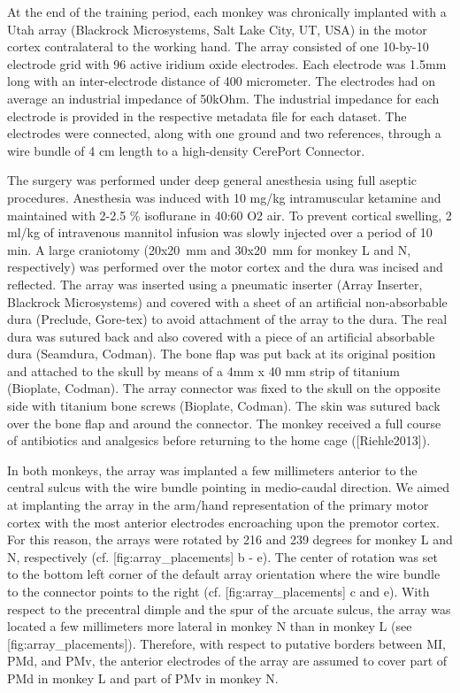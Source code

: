 {At the end of the training period, each monkey was chronically implanted with a Utah array (Blackrock Microsystems, Salt Lake City, UT, USA) in the motor cortex contralateral to the working hand. The array consisted of one 10-by-10 electrode grid with 96 active iridium oxide electrodes. Each electrode was 1.5mm long with an inter-electrode distance of 400 micrometer. The electrodes had on average an industrial impedance of 50kOhm. The industrial impedance for each electrode is provided in the respective metadata file for each dataset. The electrodes were connected, along with one ground and two references, through a wire bundle of 4 cm length to a high-density CerePort Connector. 

The surgery was performed under deep general anesthesia using full aseptic procedures. Anesthesia was induced with 10 mg/kg intramuscular ketamine and maintained with 2-2.5 \% isoflurane in 40:60 O2 air. To prevent cortical swelling, 2 ml/kg of intravenous mannitol infusion was slowly injected over a period of 10 min. A large craniotomy (20x20 mm and 30x20 mm for monkey L and N, respectively) was performed over the motor cortex and the dura was incised and reflected. The array was inserted using a pneumatic inserter (Array Inserter, Blackrock Microsystems) and covered with a sheet of an artificial non-absorbable dura (Preclude, Gore-tex) to avoid attachment of the array to the dura. The real dura was sutured back and also covered with a piece of an artificial absorbable dura (Seamdura, Codman). The bone flap was put back at its original position and attached to the skull by means of a 4mm x 40 mm strip of titanium (Bioplate, Codman). The array connector was fixed to the skull on the opposite side with titanium bone screws (Bioplate, Codman). The skin was sutured back over the bone flap and around the connector. The monkey received a full course of antibiotics and analgesics before returning to the home cage ([Riehle2013]).

In both monkeys, the array was implanted a few millimeters anterior to the central sulcus with the wire bundle pointing in medio-caudal direction. We aimed at implanting the array in the arm/hand representation of the primary motor cortex with the most anterior electrodes encroaching upon the premotor cortex. For this reason, the arrays were rotated by 216 and 239 degrees for monkey L and N, respectively (cf. [fig:array\_placements] b - e). The center of rotation was set to the bottom left corner of the default array orientation where the wire bundle to the connector points to the right (cf. [fig:array\_placements] c and e). With respect to the precentral dimple and the spur of the arcuate sulcus, the array was located a few millimeters more lateral in monkey N than in monkey L (see [fig:array\_placements]). Therefore, with respect to putative borders between MI, PMd, and PMv, the anterior electrodes of the array are assumed to cover part of PMd in monkey L and part of PMv in monkey N. 

}
